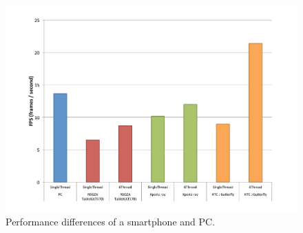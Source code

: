 \begin{figure}[!t]
 \centering
 \includegraphics[width=0.8\hsize]{fig/No14_Android_and_PC_benchmarck.pdf}
 \caption{Performance differences of a smartphone and PC.}
 \label{fig:no14}
\end{figure}
